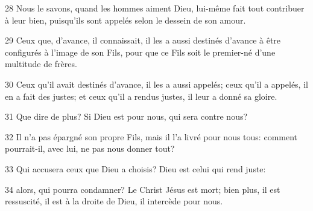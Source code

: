 28 Nous le savons, quand les hommes aiment Dieu, lui-même fait tout contribuer à leur bien, puisqu'ils sont appelés selon le dessein de son amour.

29 Ceux que, d’avance, il connaissait, il les a aussi destinés d’avance à être configurés à l’image de son Fils, pour que ce Fils soit le premier-né d’une multitude de frères.

30 Ceux qu’il avait destinés d’avance, il les a aussi appelés; ceux qu’il a appelés, il en a fait des justes; et ceux qu’il a rendus justes, il leur a donné sa gloire.

31 Que dire de plus? Si Dieu est pour nous, qui sera contre nous?

32 Il n’a pas épargné son propre Fils, mais il l’a livré pour nous tous: comment pourrait-il, avec lui, ne pas nous donner tout?

33 Qui accusera ceux que Dieu a choisis? Dieu est celui qui rend juste:

34 alors, qui pourra condamner? Le Christ Jésus est mort; bien plus, il est ressuscité, il est à la droite de Dieu, il intercède pour nous.
